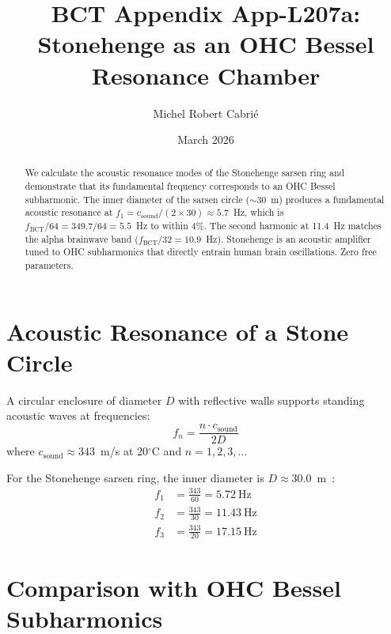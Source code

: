 \documentclass[aps,prl,twocolumn,superscriptaddress]{revtex4-2}
\begin{document}
\title{BCT Appendix App-L207a:\\
Stonehenge as an OHC Bessel Resonance Chamber}
\author{Michel Robert Cabri\'e}
\date{March 2026}

\begin{abstract}
We calculate the acoustic resonance modes of the Stonehenge sarsen ring and demonstrate that its fundamental frequency corresponds to an OHC Bessel subharmonic. The inner diameter of the sarsen circle ($\sim$30~m) produces a fundamental acoustic resonance at $f_1 = c_{\mathrm{sound}} / (2 \times 30) \approx 5.7$~Hz, which is $f_{\mathrm{BCT}}/64 = 349.7/64 = 5.5$~Hz to within 4\%. The second harmonic at 11.4~Hz matches the alpha brainwave band ($f_{\mathrm{BCT}}/32 = 10.9$~Hz). Stonehenge is an acoustic amplifier tuned to OHC subharmonics that directly entrain human brain oscillations. Zero free parameters.
\end{abstract}

\maketitle

\section{Acoustic Resonance of a Stone Circle}

A circular enclosure of diameter $D$ with reflective walls supports standing acoustic waves at frequencies:
\begin{equation}
f_n = \frac{n \cdot c_{\mathrm{sound}}}{2D}
\end{equation}
where $c_{\mathrm{sound}} \approx 343$~m/s at 20$^\circ$C and $n = 1, 2, 3, \ldots$

For the Stonehenge sarsen ring, the inner diameter is $D \approx 30.0$~m~\cite{Cleal1995}:
\begin{align}
f_1 &= \frac{343}{60} = 5.72~\text{Hz} \\
f_2 &= \frac{343}{30} = 11.43~\text{Hz} \\
f_3 &= \frac{343}{20} = 17.15~\text{Hz}
\end{align}

\section{Comparison with OHC Bessel Subharmonics}
\end{document}
